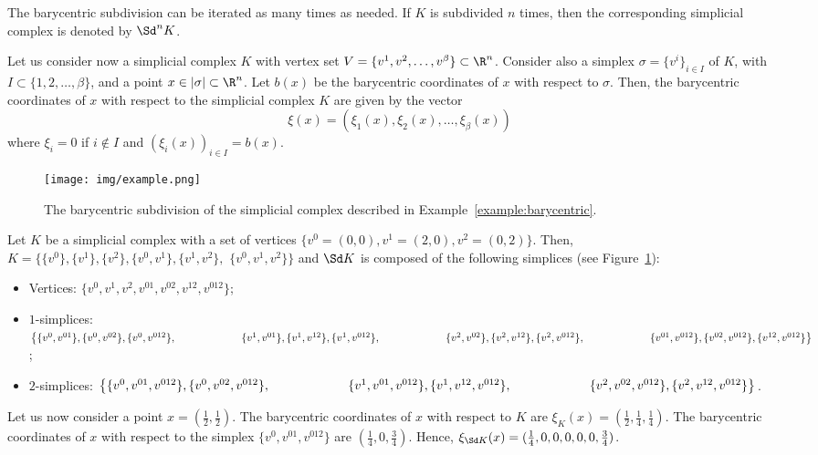 The barycentric subdivision can be iterated as many times as needed.
If $K$ is subdivided $n$ times, then the corresponding simplicial complex is denoted by $\Sd^n K$.

Let us consider now a simplicial complex $K$ with vertex set $V=\{v^1,v^2,\dots,v^{\beta}\}\subset\R^n$. 
Consider also a simplex $\sigma=
\{
v^i 
\}_{i\in I}
$ of $K$, with $I\subset \{1,2,\dots,\beta\}$, 
and a point $x\in |\sigma|\subset\R^n$.
Let $b(x)$ be the barycentric coordinates of $x$ with respect to $\sigma$.
Then, the barycentric coordinates of $x$ with respect to the simplicial complex $K$ are given
by the vector  
$$\xi(x)=(\xi_1(x),\xi_2(x),\dots, \xi_\beta(x))
$$
where 
$\xi_i=0$ if $i  \not\in 
I$ and $(\xi_i(x))_{i\in I}=b(x)
$.

\begin{figure}[ht]
    \centering
\texttt{[image: img/example.png]}  
    \caption{The barycentric subdivision of the simplicial complex described in    Example~\ref{example:barycentric}.}
    \label{fig:example1}
\end{figure}

\begin{example}\label{example:barycentric}
Let $K$ be a simplicial complex with a set of vertices $\big\{v^0=(0,0),v^1=(2,0),v^2=(0,2)\big\}$. Then, $K=\big\{\{v^0\},\{v^1\},\{v^2\},\{v^0,v^1\},\{ v^1,v^2\},$ $\{ v^0,v^1,v^2\}\big\}$ and $\Sd K$ is composed of the following simplices (see Figure~\ref{fig:example1}):
\begin{itemize}
    \item Vertices: $\{ v^0,
 v^1,
 v^2,
 v^{01},
 v^{02},
 v^{12},
 v^{012}\}$;
\item $1$-simplices: $\big\{
\{ v^0,v^{01}\},
\{ v^0,v^{02}\},
\{ v^0,v^{012}\},\\
\hspace*{2.15cm}\{ v^1,v^{01}\},
\{ v^1,v^{12}\},
\{ v^1,v^{012}\},\\
\hspace*{2.15cm}
\{ v^2,v^{02}\},
\{ v^2,v^{12}\},
\{ v^2,v^{012}\},\\
\hspace*{2.15cm}
\{ v^{01},v^{012}\},
\{ v^{02},v^{012}\},
\{ v^{12},v^{012}\}
\big\}$; 
    \item $2$-simplices: $\big\{
\{ v^0,v^{01},v^{012}\},
\{ v^0,v^{02},v^{012}\},\\ \hspace*{2.15cm} \{ v^1,v^{01},v^{012}\},  \{ v^1,v^{12},v^{012}\},\\
\hspace*{2.15cm} \{ v^2,v^{02},v^{012}\},
\{ v^2,v^{12},v^{012}\}
\big\}$.
\end{itemize}
Let us now consider a point $x=(\frac{1}{2},\frac{1}{2})$. The barycentric coordinates of $x$ with respect to $K$ are $\xi_K(x)=(\frac{1}{2},\frac{1}{4},\frac{1}{4})$. The barycentric coordinates of $x$ with respect to the simplex $\{ v^0,v^{01},v^{012} \} $  are $(\frac{1}{4},0,\frac{3}{4})$. Hence, $\xi_{\Sd K}(x)=(\frac{1}{4},0,0,0,0,0,\frac{3}{4})$.
\end{example}

